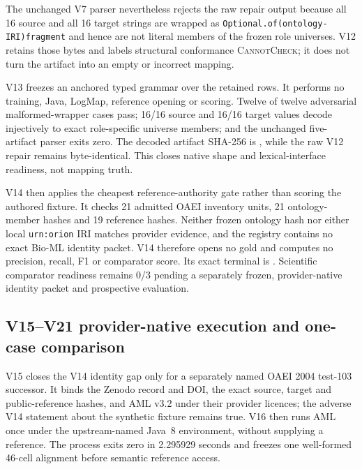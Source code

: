 The unchanged V7 parser nevertheless rejects the raw repair output because all
16 source and all 16 target strings are wrapped as
\texttt{Optional.of(ontology-IRI)fragment} and hence are not literal members of
the frozen role universes. V12 retains those bytes and labels structural
conformance \textsc{CannotCheck}; it does not turn the artifact into an empty
or incorrect mapping.

V13 freezes an anchored typed grammar over the retained rows. It performs no
training, Java, LogMap, reference opening or scoring. Twelve of twelve
adversarial malformed-wrapper cases pass; 16/16 source and 16/16 target values
decode injectively to exact role-specific universe members; and the unchanged
five-artifact parser exits zero. The decoded artifact SHA-256 is
,
while the raw V12 repair remains byte-identical. This closes native shape and
lexical-interface readiness, not mapping truth.

V14 then applies the cheapest reference-authority gate rather than scoring the
authored fixture. It checks 21 admitted OAEI inventory units, 21 ontology-member
hashes and 19 reference hashes. Neither frozen ontology hash nor either local
\texttt{urn:orion} IRI matches provider evidence, and the registry contains no
exact Bio-ML identity packet. V14 therefore opens no gold and computes no
precision, recall, F1 or comparator score. Its exact terminal is
.
Scientific comparator readiness remains 0/3 pending a separately frozen,
provider-native identity packet and prospective evaluation.

\subsection{V15--V21 provider-native execution and one-case comparison}

V15 closes the V14 identity gap only for a separately named OAEI 2004
test-103 successor. It binds the Zenodo record and DOI, the exact source,
target and public-reference hashes, and AML v3.2 under their provider licences;
the adverse V14 statement about the synthetic fixture remains true. V16 then
runs AML once under the upstream-named Java~8 environment, without supplying a
reference. The process exits zero in 2.295929 seconds and freezes one
well-formed 46-cell alignment before semantic reference access.

